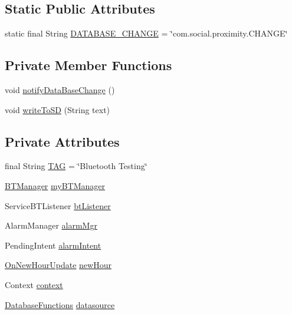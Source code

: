 \subsection*{Static Public Attributes}
\begin{DoxyCompactItemize}
\item 
static final String \hyperlink{classcom_1_1social_1_1proximity_1_1_social_proximity_a4019a76ca6d383cb77b9e81f1b7c2cca}{D\+A\+T\+A\+B\+A\+S\+E\+\_\+\+C\+H\+A\+N\+G\+E} = \char`\"{}com.\+social.\+proximity.\+C\+H\+A\+N\+G\+E\char`\"{}
\end{DoxyCompactItemize}
\subsection*{Private Member Functions}
\begin{DoxyCompactItemize}
\item 
void \hyperlink{classcom_1_1social_1_1proximity_1_1_social_proximity_a64e73fce0d2fe51898d7b6218e2fd744}{notify\+Data\+Base\+Change} ()
\item 
void \hyperlink{classcom_1_1social_1_1proximity_1_1_social_proximity_aa5ed8999ce753a87c15272798eaf99be}{write\+To\+S\+D} (String text)
\end{DoxyCompactItemize}
\subsection*{Private Attributes}
\begin{DoxyCompactItemize}
\item 
final String \hyperlink{classcom_1_1social_1_1proximity_1_1_social_proximity_ac2be9322648a27ced5d00e8eae40bac4}{T\+A\+G} = \char`\"{}Bluetooth Testing\char`\"{}
\item 
\hyperlink{classcom_1_1social_1_1proximity_1_1_b_t_manager}{B\+T\+Manager} \hyperlink{classcom_1_1social_1_1proximity_1_1_social_proximity_a7833a112a845f6ff11f5101bbd40d98b}{my\+B\+T\+Manager}
\item 
Service\+B\+T\+Listener \hyperlink{classcom_1_1social_1_1proximity_1_1_social_proximity_a54409038923d01acde8779da84812350}{bt\+Listener}
\item 
Alarm\+Manager \hyperlink{classcom_1_1social_1_1proximity_1_1_social_proximity_afddec12a7de1b3e5e9dc86da413da78f}{alarm\+Mgr}
\item 
Pending\+Intent \hyperlink{classcom_1_1social_1_1proximity_1_1_social_proximity_ae91f5ac95c6c68993a47e70e8e7f5854}{alarm\+Intent}
\item 
\hyperlink{classcom_1_1social_1_1proximity_1_1_on_new_hour_update}{On\+New\+Hour\+Update} \hyperlink{classcom_1_1social_1_1proximity_1_1_social_proximity_ab3d29f906dd80ba99f79bbe848658294}{new\+Hour}
\item 
Context \hyperlink{classcom_1_1social_1_1proximity_1_1_social_proximity_a094349a2f8b31f6f13353abec962f0a4}{context}
\item 
\hyperlink{classcom_1_1social_1_1proximity_1_1_database_functions}{Database\+Functions} \hyperlink{classcom_1_1social_1_1proximity_1_1_social_proximity_ac36be388d1519a9c1ec298bcac0aa3f2}{datasource}
\end{DoxyCompactItemize}


